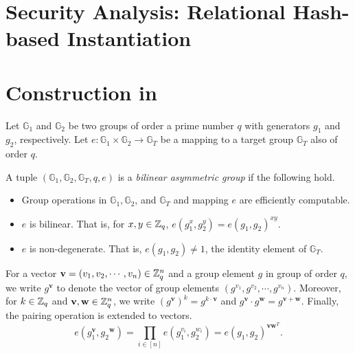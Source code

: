 \section{Security Analysis: Relational Hash-based Instantiation}
\label{sec:security_analysis:rh}



\newpage
\appendix


\section{Construction in \cite{cryptoeprint:2016/440}}
\label{sec:fh-IPFE-construction}

Let $\mathbb{G}_1$ and $\mathbb{G}_2$ be two groups of order a prime number $q$ with generators $g_1$ and $g_2$, respectively. Let $e: \mathbb{G}_1 \times \mathbb{G}_2 \to \mathbb{G}_T$ be a mapping to a target group $\mathbb{G}_T$ also of order $q$. 

\begin{definition}
\label{bilinear-group}

A tuple $(\mathbb{G}_1, \mathbb{G}_2, \mathbb{G}_T, q, e)$ is a \emph{bilinear asymmetric group} if the following hold.

\begin{itemize}

	\item Group operations in $\mathbb{G}_1, \mathbb{G}_2$, and $\mathbb{G}_T$ and mapping $e$ are efficiently computable.

	\item $e$ is bilinear. That is, for $x, y \in \mathbb{Z}_q$, $e(g_1^x, g_2^y) = e(g_1, g_2)^{xy}$.

	\item $e$ is non-degenerate. That is, $e(g_1, g_2) \neq 1$, the identity element of $\mathbb{G}_T$.

\end{itemize}

\end{definition}

For a vector $\mathbf{v} = (v_1, v_2, \cdots, v_n) \in \mathbb{Z}_q^n$ and a group element $g$ in group of order $q$, we write $g^\mathbf{v}$ to denote the vector of group elements $(g^{v_1}, g^{v_2}, \cdots, g^{v_n})$. Moreover, for $k \in \mathbb{Z}_q$ and $\mathbf{v}, \mathbf{w} \in \mathbb{Z}_q^n$, we write $(g^{\mathbf{v}})^k = g^{k \cdot \mathbf{v}}$ and $g^\mathbf{v} \cdot g^\mathbf{w} =  g^{\mathbf{v} + \mathbf{w}}$. Finally, the pairing operation is extended to vectors.
\[
	e(g_1^{\mathbf{v}}, g_2{^\mathbf{w}}) = \prod_{i \in [n]} e(g_1^{v_i}, g_2^{w_i}) = e(g_1, g_2)^{\mathbf{v}\mathbf{w}^T}.
\]

